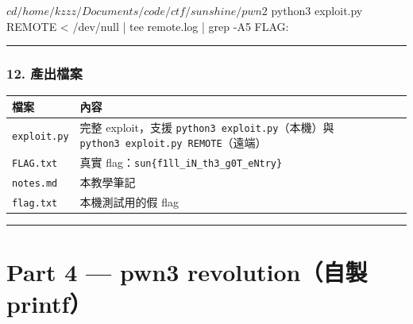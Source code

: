 \documentclass[10pt,a4paper]{article}
\newcounter{none}
\newenvironment{Shaded}{\begin{snugshade}}{\end{snugshade}}
\newcommand{\NormalTok}[1]{#1}
\renewenvironment{Shaded}{%
  \def\FrameCommand{\fboxsep=3.2pt\colorbox{shadecolor}}%
  \MakeFramed{\advance\hsize-\width\FrameRestore\small}%
}{%
  \endMakeFramed
}
\begin{document}
\begin{Shaded}
\begin{Highlighting}[]
\NormalTok{$ cd /home/kzzz/Documents/code/ctf/sunshine/pwn2}
\NormalTok{$ python3 exploit.py REMOTE \textless{} /dev/null | tee remote.log | grep {-}A5 \textquotesingle{}FLAG:\textquotesingle{}}
\end{Highlighting}
\end{Shaded}

\begin{center}\rule{0.5\linewidth}{0.5pt}\end{center}

\subsubsection{12. 產出檔案}\label{ux7522ux51faux6a94ux6848}

{\def\LTcaptype{none} %
\begin{longtable}[]{@{}
  >{\raggedright\arraybackslash}p{}
  >{\raggedright\arraybackslash}p{}@{}}
\toprule\noalign{}
\begin{minipage}[b]{\linewidth}\raggedright
檔案
\end{minipage} & \begin{minipage}[b]{\linewidth}\raggedright
內容
\end{minipage} \\
\midrule\noalign{}
\endhead
\bottomrule\noalign{}
\endlastfoot
\texttt{exploit.\allowbreak{}py} & 完整 exploit，支援
\texttt{python3\ \allowbreak{}exploit.\allowbreak{}py}（本機）與
\texttt{python3\ \allowbreak{}exploit.\allowbreak{}py\ \allowbreak{}REMOTE}（遠端） \\
\texttt{FLAG.\allowbreak{}txt} & 真實
flag：\texttt{sun\{\allowbreak{}f1ll\_\allowbreak{}iN\_\allowbreak{}th3\_\allowbreak{}g0T\_\allowbreak{}eNtry\}\allowbreak{}} \\
\texttt{notes.\allowbreak{}md} & 本教學筆記 \\
\texttt{flag.\allowbreak{}txt} & 本機測試用的假 flag \\
\end{longtable}
}

\begin{center}\rule{0.5\linewidth}{0.5pt}\end{center}

\section{Part 4 --- pwn3 revolution（自製
printf）}\label{part-4-pwn3-revolutionux81eaux88fd-printf}
\end{document}
